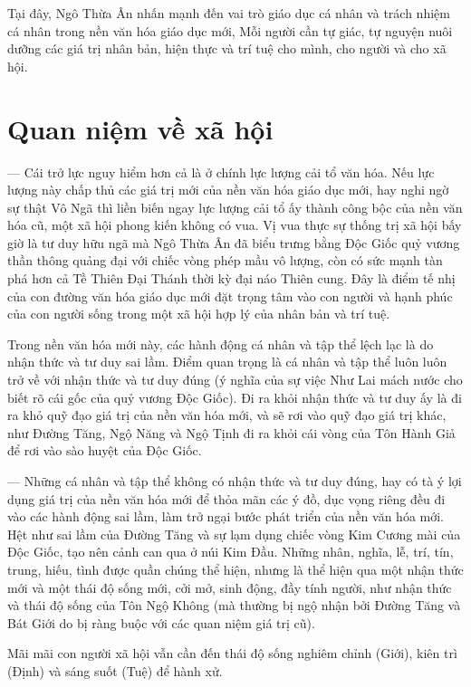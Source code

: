 Tại đây, Ngô Thừa Ân nhấn mạnh đến vai trò giáo dục cá nhân và trách nhiệm cá nhân trong nền văn hóa giáo dục mới, Mỗi người cần tự giác, tự nguyện nuôi dưỡng các giá trị nhân bản, hiện thực và trí tuệ cho mình, cho người và cho xã hội.

\section{Quan niệm về xã hội} %
\label{sec:50_51_xa_hoi}

— Cái trở lực nguy hiểm hơn cả là ở chính lực lượng cải tổ văn hóa. Nếu lực lượng này chấp thủ các giá trị mới của nền văn hóa giáo dục mới, hay nghi ngờ sự thật Vô Ngã thì liền biến ngay lực lượng cải tổ ấy thành công bộc của nền văn hóa cũ, một xã hội phong kiến không có vua. Vị vua thực sự thống trị xã hội bấy giờ là tư duy hữu ngã mà Ngô Thừa Ân đã biểu trưng bằng Độc Giốc quỷ vương thần thông quảng đại với chiếc vòng phép mầu vô lượng, còn có sức mạnh tàn phá hơn cả Tề Thiên Đại Thánh thời kỳ đại náo Thiên cung. Đây là điểm tế nhị của con đường văn hóa giáo dục mới đặt trọng tâm vào con người và hạnh phúc của con người sống trong một xã hội hợp lý của nhân bản và trí tuệ.

Trong nền văn hóa mới này, các hành động cá nhân và tập thể lệch lạc là do nhận thức và tư duy sai lầm. Điểm quan trọng là cá nhân và tập thể luôn luôn trở về với nhận thức và tư duy đúng (ý nghĩa của sự việc Như Lai mách nước cho biết rõ cái gốc của quỷ vương Độc Giốc). Đi ra khỏi nhận thức và tư duy ấy là đi ra khỏ quỹ đạo giá trị của nền văn hóa mới, và sẽ rơi vào quỹ đạo giá trị khác, như Đường Tăng, Ngộ Năng và Ngộ Tịnh đi ra khỏi cái vòng của Tôn Hành Giả để rơi vào sào huyệt của Độc Giốc.

— Những cá nhân và tập thể không có nhận thức và tư duy đúng, hay có tà ý lợi dụng giá trị của nền văn hóa mới để thỏa mãn các ý đồ, dục vọng riêng đều đi vào các hành động sai lầm, làm trở ngại bước phát triển của nền văn hóa mới. Hệt như sai lầm của Đường Tăng và sự lạm dụng chiếc vòng Kim Cương mài của Độc Giốc, tạo nên cảnh can qua ở núi Kim Đầu. Những nhân, nghĩa, lễ, trí, tín, trung, hiếu, tình được quần chúng thể hiện, nhưng là thể hiện qua một nhận thức mới và một thái độ sống mới, cởi mở, sinh động, đầy tính người, như nhận thức và thái độ sống của Tôn Ngộ Không (mà thường bị ngộ nhận bởi Đường Tăng và Bát Giới do bị ràng buộc với các quan niệm giá trị cũ).

Mãi mãi con người xã hội vẫn cần đến thái độ sống nghiêm chỉnh (Giới), kiên trì (Định) và sáng suốt (Tuệ) để hành xử.
